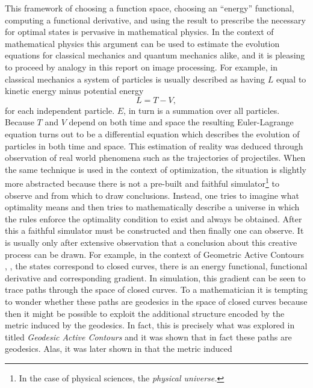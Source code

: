     This framework of choosing a function space, choosing an ``energy'' functional, 
    computing a functional derivative, and using the result to prescribe the
    necessary for optimal states is pervasive in mathematical physics. In the 
    context of mathematical physics this argument can be used to estimate the 
    evolution equations for classical mechanics and quantum mechanics alike,
    and it is pleasing to proceed by analogy in this report on image processing.
    For example, in classical mechanics a system of particles
    is usually described as having \(L\) equal to kinetic energy minus
    potential energy
    \[
        L = T - V,
    \]
    for each independent particle. \(E\), in turn is a summation
    over all particles. Because \(T\) and \(V\) depend on both time
    and space the resulting Euler-Lagrange equation turns out to be
    a differential equation which describes the evolution of particles in both 
    time and space. This estimation of reality was deduced through observation of
    real world phenomena such as the trajectories of projectiles.
    When the same technique is used in the context of optimization, 
    the situation is slightly more abstracted because there is not a pre-built and faithful 
    simulator\footnote{In the case of physical sciences, the \emph{physical universe.}}
    to observe and from which to draw conclusions. Instead, one tries
    to imagine what optimality means and then tries to mathematically describe a
    universe in which the rules enforce the optimality condition
    to exist and always be obtained. After this a faithful simulator
    must be constructed and then finally one can observe. It is usually only
    after extensive observation that a conclusion about this creative process
    can be drawn. For example, in the context of Geometric Active Contours
    \citep{Kass:Snakes}, 
    \citep{Kichenassamy:GFGAC}, 
    \citep{Chan:ACWE}
    the states correspond to closed curves, there is an energy functional, 
    functional derivative and corresponding gradient. In simulation, this
    gradient can be seen to trace paths through the space of closed curves. 
    To a mathematician it is tempting to wonder whether these paths are geodesics 
    in the space of closed curves because then it might be possible to exploit the additional structure
    encoded by the metric induced by the geodesics. In fact, this is precisely
    what was explored in \citep{Caselles:GAC} titled \emph{Geodesic Active Contours}
    and it was shown that in fact these paths are geodesics. 
    Alas, it was later shown in \citep{Michor:RG} that the metric induced
